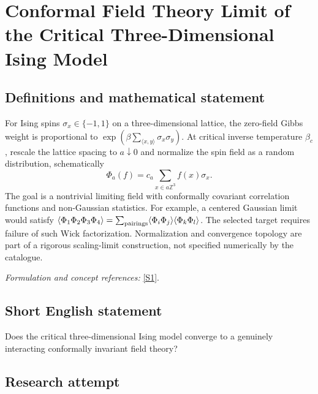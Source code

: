 \documentclass[11pt,a4paper]{article}
\newcommand{\Z}{\mathbb{Z}}
\newcommand{\sref}[2]{\hyperlink{source:#1:#2}{[S#2]}}
\newif\ifshowcatalogue
\newcommand{\cataloguescope}[1]{\ifshowcatalogue
 \paragraph{Exact scope in the supplied catalogue.}
 \begin{quote}\small #1\end{quote}\fi}
\numberwithin{equation}{section}
\begin{document}
\setcounter{section}{0}
\clearpage
\section*{\texorpdfstring{Conformal Field Theory Limit of the Critical Three-Dimensional Ising Model}{Conformal Field Theory Limit of the Critical Three-Dimensional Ising Model}}\label{statement}
\subsection{Definitions and mathematical statement}
For Ising spins $\sigma_x\in\{-1,1\}$ on a three-dimensional lattice, the zero-field Gibbs weight is proportional to $\exp(\beta\sum_{\langle x,y\rangle}\sigma_x\sigma_y)$. At critical inverse temperature $\beta_c$, rescale the lattice spacing to $a\downarrow0$ and normalize the spin field as a random distribution, schematically
\[
 \Phi_a(f)=c_a\sum_{x\in a\Z^3}f(x)\sigma_x.
\]
The goal is a nontrivial limiting field with conformally covariant correlation functions and non-Gaussian statistics. For example, a centered Gaussian limit would satisfy $\langle\Phi_1\Phi_2\Phi_3\Phi_4\rangle=\sum_{\rm pairings}\langle\Phi_i\Phi_j\rangle\langle\Phi_k\Phi_l\rangle$. The selected target requires failure of such Wick factorization. Normalization and convergence topology are part of a rigorous scaling-limit construction, not specified numerically by the catalogue.
\par\smallskip\textit{Formulation and concept references:} \sref{statement}{1}.
\cataloguescope{Prove that the scaling limit of the critical three-dimensional Ising model exists and is conformally invariant, with a non-Gaussian spin field whose limiting spin correlations do not factorize according to Wick's rule.}
\subsection{Short English statement}
Does the critical three-dimensional Ising model converge to a genuinely interacting conformally invariant field theory?
\subsection{Research attempt}
\end{document}
